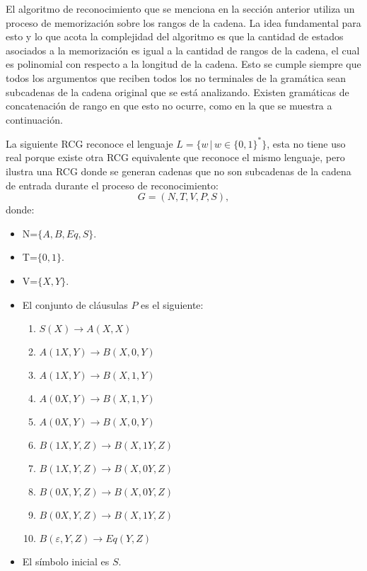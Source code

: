 \documentclass[12pt]{article}
\begin{document}
El algoritmo de reconocimiento que se menciona en la sección anterior utiliza un proceso de memorización sobre 
los rangos de la cadena.  La idea fundamental para esto y lo que acota la complejidad del algoritmo es que la 
cantidad de estados asociados a la memorización es igual a la cantidad de rangos de la cadena, el cual es 
polinomial con respecto a la longitud de la cadena. Esto se cumple siempre que todos los argumentos que reciben 
todos los no terminales de la gramática sean subcadenas de la cadena original que se está analizando. Existen 
gramáticas de concatenación de rango en que esto no ocurre, como en la que se muestra a continuación.

La siguiente RCG reconoce el lenguaje $L=\{w\,|\,w\in\{0,1\}^*\}$, esta no tiene uso real porque existe otra RCG equivalente que reconoce el
mismo lenguaje, pero ilustra una RCG donde se generan cadenas que no son subcadenas de la cadena de entrada durante el proceso
de reconocimiento:
\[
    G = (N, T, V, P, S),
\]
donde:

\begin{itemize}
    \item  N=$\{A,B,Eq,S\}$.
    \item T=$\{0,1\}$.
    \item V=$\{X,Y\}$.
    \item El conjunto de cláusulas $P$ es el siguiente:
          \begin{enumerate}
              \item $S(X)\to A(X,X)$
              \item $A(1X,Y)\to B(X,0,Y)$
              \item $A(1X,Y)\to B(X,1,Y)$
              \item $A(0X,Y)\to B(X,1,Y)$
              \item $A(0X,Y)\to B(X,0,Y)$
              \item $B(1X,Y,Z)\to B(X,1Y,Z)$
              \item $B(1X,Y,Z)\to B(X,0Y,Z)$
              \item $B(0X,Y,Z)\to B(X,0Y,Z)$
              \item $B(0X,Y,Z)\to B(X,1Y,Z)$
              \item $B(\varepsilon,Y,Z)\to Eq(Y,Z)$
          \end{enumerate}
          
    \item El símbolo inicial es $S$.
\end{itemize}
\end{document}
